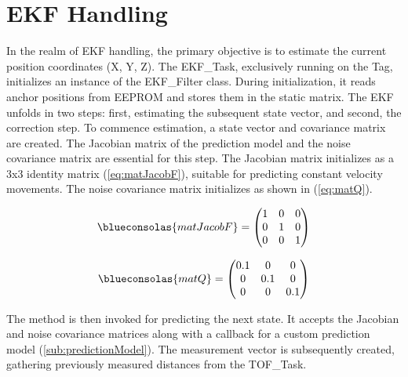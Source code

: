 \chapter{EKF Handling}
\label{chap:EKF_Handling}

In the realm of EKF handling, the primary objective is to estimate the current position coordinates (X, Y, Z). The EKF\_Task, exclusively running on the Tag, initializes an instance of the EKF\_Filter class. During initialization, it reads anchor positions from EEPROM and stores them in the static  matrix.
\vspace{4pt}
\newline
The EKF unfolds in two steps: first, estimating the subsequent state vector, and second, the correction step. To commence estimation, a state vector and covariance matrix are created. The Jacobian matrix of the prediction model and the noise covariance matrix are essential for this step. The Jacobian matrix  initializes as a 3x3 identity matrix (\ref{eq:matJacobF}), suitable for predicting constant velocity movements. The noise covariance matrix  initializes as shown in (\ref{eq:matQ}).

\begin{equation}
	\begin{centering}
		\blueconsolas{matJacobF} =
		\begin{pmatrix}
			1 & 0 & 0 \\
			0 & 1 & 0 \\
			0 & 0 & 1
		\end{pmatrix}
	\end{centering}
	\label{eq:matJacobF}
\end{equation}

\begin{equation}
	\begin{centering}
		\blueconsolas{matQ} =
		\begin{pmatrix}
			0.1 & 0 & 0 \\
			0 & 0.1 & 0 \\
			0 & 0 & 0.1
		\end{pmatrix}
	\end{centering}
	\label{eq:matQ}
\end{equation}

The  method is then invoked for predicting the next state. It accepts the Jacobian and noise covariance matrices along with a callback for a custom prediction model (\ref{sub:predictionModel}). The measurement vector  is subsequently created, gathering previously measured distances from the TOF\_Task.

